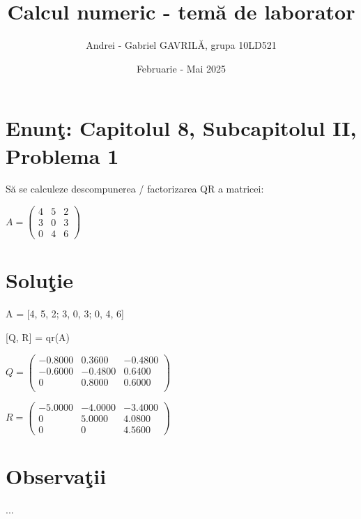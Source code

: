 \documentclass{article}
\begin{document}
\title{Calcul numeric - tem\u{a} de laborator}

\author{Andrei - Gabriel GAVRIL\u{A}, grupa 10LD521}

\date{Februarie - Mai 2025}

\maketitle

\section*{Enun\c{t}: Capitolul 8, Subcapitolul II, Problema 1}

S\u{a} se calculeze descompunerea / factorizarea QR a matricei:
\begin{center}
$
A=\begin{pmatrix}
  4 & 5 & 2 \\
  3 & 0 & 3 \\
  0 & 4 & 6
\end{pmatrix}
$
\end{center}

\section*{Solu\c{t}ie}

\begin{center}
A = [4, 5, 2; 3, 0, 3; 0, 4, 6]
\end{center}
\begin{center}
[Q, R] = qr(A)
\end{center}

\begin{center}
$
Q =\begin{pmatrix}
  -0.8000 &    0.3600 &   -0.4800 \\
  -0.6000 &   -0.4800 &    0.6400 \\
        0 &    0.8000 &    0.6000 \\
\end{pmatrix}
$
\end{center}

\begin{center}
$
R =\begin{pmatrix}
  -5.0000 &   -4.0000 &   -3.4000 \\
        0 &    5.0000 &    4.0800 \\
        0 &         0 &    4.5600
\end{pmatrix}
$
\end{center} 
    
\section*{Observa\c{t}ii}

...
\end{document}
